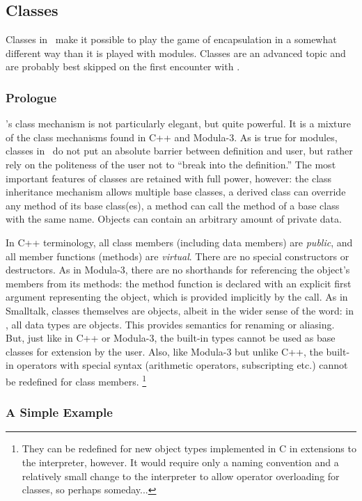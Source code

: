 \subsection{Classes}

Classes in \Python\ make it possible to play the game of encapsulation in a
somewhat different way than it is played with modules.
Classes are an advanced topic and are probably best skipped on the first
encounter with \Python.

\subsubsection{Prologue}

\Python's class mechanism is not particularly elegant, but quite powerful.
It is a mixture of the class mechanisms found in C++ and Modula-3.
As is true for modules, classes in \Python\ do not put an absolute barrier
between definition and user, but rather rely on the politeness of the
user not to ``break into the definition.''
The most important features of classes are retained with full power,
however: the class inheritance mechanism allows multiple base classes,
a derived class can override any method of its base class(es), a method
can call the method of a base class with the same name.
Objects can contain an arbitrary amount of private data.

In C++ terminology, all class members (including data members) are
{\it public},
and all member functions (methods) are
{\it virtual}.
There are no special constructors or destructors.
As in Modula-3, there are no shorthands for referencing the object's
members from its methods: the method function is declared with an
explicit first argument representing the object, which is provided
implicitly by the call.
As in Smalltalk, classes themselves are objects, albeit in the wider
sense of the word: in \Python, all data types are objects.
This provides semantics for renaming or aliasing.
But, just like in C++ or Modula-3, the built-in types cannot be used as
base classes for extension by the user.
Also, like Modula-3 but unlike C++, the built-in operators with special
syntax (arithmetic operators, subscripting etc.) cannot be redefined for
class members.%
\footnote{
	They can be redefined for new object types implemented in C in
	extensions to the interpreter, however.  It would require only a
	naming convention and a relatively small change to the
	interpreter to allow operator overloading for classes, so
	perhaps someday...
}

\subsubsection{A Simple Example}

